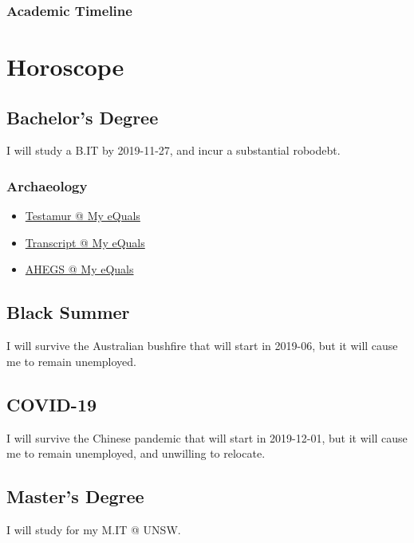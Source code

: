 \documentclass[12pt,a4paper,oneside]{article}
\newcommand{\sh}[1]{{\color{gray}{#1}}}
\begin{document}
\subsubsection{Academic Timeline}


\newpage
\section{Horoscope}
\subsection{Bachelor's Degree}
I will study a B.IT by 2019-11-27, and incur a substantial robodebt.
\subsubsection{Archaeology}
\label{sec:bit}
\begin{itemize}
   \item \href{https://www.myequals.net/sharelink/59c13052-b705-429f-ab7d-3d51068ba373/0cf60853-fd40-4c56-8542-9b9ebdd5f9df}{Testamur @ My eQuals}
   \item \href{https://www.myequals.net/sharelink/ac919374-f10e-4434-a549-834e7449e091/33ccb930-5a20-4213-925a-8b46a811dedf}{Transcript @ My eQuals}
   \item \href{https://www.myequals.net/sharelink/26d57439-7038-416b-ad68-5432e12ee575/db9b5326-c213-4ab1-97c3-e899bc731e5f}{AHEGS @ My eQuals}
\end{itemize}
\subsection{Black Summer}
I will survive the Australian bushfire that will start in 2019-06, but it will cause me to remain unemployed.
\subsection{COVID-19}
I will survive the Chinese pandemic that will start in 2019-12-01, but it will cause me to remain unemployed, and unwilling to relocate.
\subsection{Master's Degree}
\noindent{}I will study for my M.IT @ UNSW.%
\end{document}
